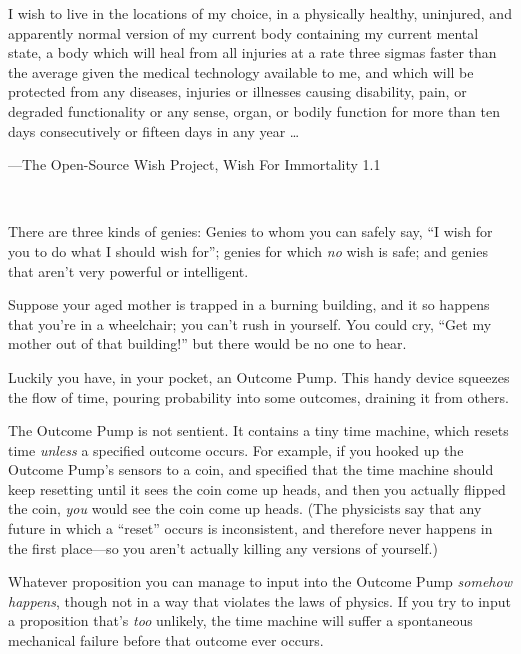 \myendsectiontext


{
 I wish to live in the locations of my choice, in a physically
healthy, uninjured, and apparently normal version of my current body
containing my current mental state, a body which will heal from all
injuries at a rate three sigmas faster than the average given the
medical technology available to me, and which will be protected from
any diseases, injuries or illnesses causing disability, pain, or
degraded functionality or any sense, organ, or bodily function for more
than ten days consecutively or fifteen days in any year \ldots}

{\raggedleft
 {}---The Open-Source Wish Project, Wish For Immortality 1.1
\par}


\bigskip

{
 ~}

{
 There are three kinds of genies: Genies to whom you can safely
say, ``I wish for you to do what I should wish
for''; genies for which \textit{no} wish is safe; and
genies that aren't very powerful or intelligent.}

{
 Suppose your aged mother is trapped in a burning building, and it
so happens that you're in a wheelchair; you
can't rush in yourself. You could cry,
``Get my mother out of that
building!'' but there would be no one to hear.}

{
 Luckily you have, in your pocket, an Outcome Pump. This handy
device squeezes the flow of time, pouring probability into some
outcomes, draining it from others.}

{
 The Outcome Pump is not sentient. It contains a tiny time machine,
which resets time \textit{unless} a specified outcome occurs. For
example, if you hooked up the Outcome Pump's sensors to
a coin, and specified that the time machine should keep resetting until
it sees the coin come up heads, and then you actually flipped the coin,
\textit{you} would see the coin come up heads. (The physicists say that
any future in which a ``reset''
occurs is inconsistent, and therefore never happens in the first
place---so you aren't actually killing any versions of
yourself.)}

{
 Whatever proposition you can manage to input into the Outcome Pump
\textit{somehow happens}, though not in a way that violates the laws of
physics. If you try to input a proposition that's
\textit{too} unlikely, the time machine will suffer a spontaneous
mechanical failure before that outcome ever occurs.}


